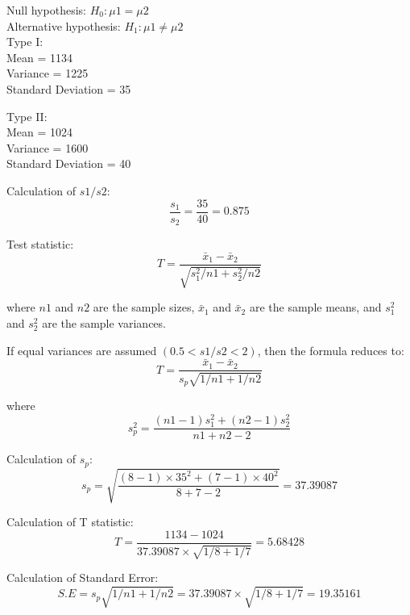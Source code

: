 \documentclass[a4paper,11pt,openright]{report}
\begin{document}
\begin{enumerate}
Null hypothesis: $H_{0}: \mu 1 = \mu 2$ \\
Alternative hypothesis: $H_{1}: \mu 1 \neq \mu 2$ \\

Type I: \\
\hspace*{10mm} Mean = 1134 \\
\hspace*{10mm} Variance = 1225 \\
\hspace*{10mm} Standard Deviation = 35

Type II: \\
\hspace*{10mm} Mean = 1024 \\
\hspace*{10mm} Variance = 1600 \\
\hspace*{10mm} Standard Deviation = 40

Calculation of $s1/s2$:
\begin{equation*}
\frac{s_{1}}{s_{2}} = \frac{35}{40} = 0.875
\end{equation*}

Test statistic: 
\begin{equation*}
T = \frac{\bar x_{1} - \bar x_{2}}{\sqrt{s_{1}^{2}/n1 + s_{2}^{2}/n2}}
\end{equation*}

where $n1$ and $n2$ are the sample sizes, $\bar x_{1}$ and $\bar x_{2}$ are the sample
means, and $s_{1}^{2}$ and $s_{2}^{2}$ are the sample variances. 

If equal variances are assumed $(0.5 < s1/s2 < 2)$, then the formula reduces to:
\begin{equation*}
T = \frac{\bar x_{1} - \bar x_{2}}{s_{p} \sqrt{1/n1 + 1/n2}}
\end{equation*}

where
\begin{equation*}
s_{p}^{2} = \frac{(n1-1)s_{1}^{2} + (n2-1)s_{2}^{2}}{n1+n2-2}
\end{equation*}

Calculation of $s_{p}$:
\begin{equation*}
s_{p} = \sqrt{\frac{(8-1) \times 35^{2} + (7-1) \times 40^{2}}{8+7-2}} 
      = 37.39087
\end{equation*}

Calculation of T statistic:
\begin{equation*}
T = \frac{1134 - 1024}{37.39087 \times \sqrt{1/8 + 1/7}} = 5.68428
\end{equation*}

Calculation of Standard Error:
\begin{equation*}
S.E = s_{p} \sqrt{1/n1 + 1/n2} = 37.39087 \times \sqrt{1/8 + 1/7} = 19.35161
\end{equation*}

\end{enumerate}
\end{document}
